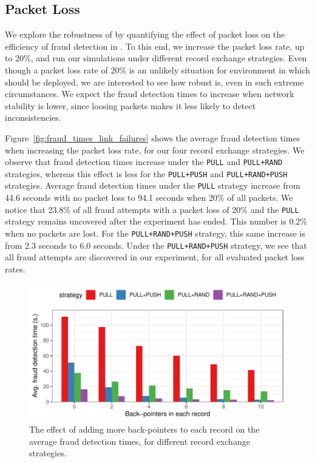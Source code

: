 \subsection{Packet Loss}
We explore the robustness of \ModelName{} by quantifying the effect of packet loss on the efficiency of fraud detection in \ModelName{}.
To this end, we increase the packet loss rate, up to 20\%, and run our simulations under different record exchange strategies.
Even though a packet loss rate of 20\% is an unlikely situation for environment in which \ModelName{} should be deployed, we are interested to see how robust \ModelName{} is, even in such extreme circumstances.
We expect the fraud detection times to increase when network stability is lower, since loosing packets makes it less likely to detect inconsistencies.

Figure~\ref{fig:fraud_times_link_failures} shows the average fraud detection times when increasing the packet loss rate, for our four record exchange strategies.
We observe that fraud detection times increase under the \texttt{PULL} and \texttt{PULL+RAND} strategies, whereas this effect is less for the \texttt{PULL+PUSH} and \texttt{PULL+RAND+PUSH} strategies.
Average fraud detection times under the \texttt{PULL} strategy increase from 44.6 seconds with no packet loss to 94.1 seconds when 20\% of all packets.
We notice that 23.8\% of all fraud attempts with a packet loss of 20\% and the \texttt{PULL} strategy remains uncovered after the experiment has ended.
This number is 0.2\% when no packets are lost.
For the \texttt{PULL+RAND+PUSH} strategy, this same increase is from 2.3 seconds to 6.0 seconds.
Under the \texttt{PULL+RAND+PUSH} strategy, we see that all fraud attempts are discovered in our experiment, for all evaluated packet loss rates.

\begin{figure}[t]
	\centering
	\includegraphics[width=.9\linewidth]{trustchain/assets/fraud_times_back_pointers}
	\caption{The effect of adding more back-pointers to each record on the average fraud detection times, for different record exchange strategies.}
	\label{fig:fraud_times_back_pointers}
\end{figure}

